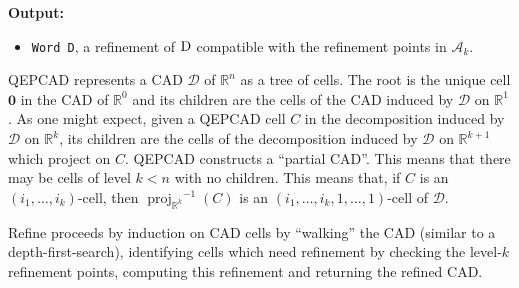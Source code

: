 \documentclass[
]{book}
\providecommand{\tightlist}{%
  \setlength{\itemsep}{0pt}\setlength{\parskip}{0pt}}
\theoremstyle{definition}
\theoremstyle{definition}
\theoremstyle{definition}
\theoremstyle{definition}
\theoremstyle{remark}
\begin{document}
\textbf{Output:}

\begin{itemize}
\tightlist
\item
  \texttt{Word\ D\textquotesingle{}}, a refinement of \(\rm{D}\) compatible with the refinement points in \(\mathcal{A}_k\).
\end{itemize}

QEPCAD represents a CAD \(\mathcal{D}\) of \(\mathbb{R}^n\) as a tree of cells. The root is the unique cell \(\mathbf{0}\) in the CAD of \(\mathbb{R}^0\) and its children are the cells of the CAD induced by \(\mathcal{D}\) on \(\mathbb{R}^1\). As one might expect, given a QEPCAD cell \(C\) in the decomposition induced by \(\mathcal{D}\) on \(\mathbb{R}^k\), its children are the cells of the decomposition induced by \(\mathcal{D}\) on \(\mathbb{R}^{k+1}\) which project on \(C\). QEPCAD constructs a ``partial CAD''. This means that there may be cells of level \(k < n\) with no children. This means that, if \(C\) is an \((i_1,\ldots,i_k)\)-cell, then \({\operatorname{proj}_{\mathbb{R}^{k}}}^{-1}(C)\) is an \((i_1,\ldots,i_k,1,\ldots,1)\)-cell of \(\mathcal{D}\).

Refine proceeds by induction on CAD cells by ``walking'' the CAD (similar to a depth-first-search), identifying cells which need refinement by checking the level-\(k\) refinement points, computing this refinement and returning the refined CAD.
\end{document}
